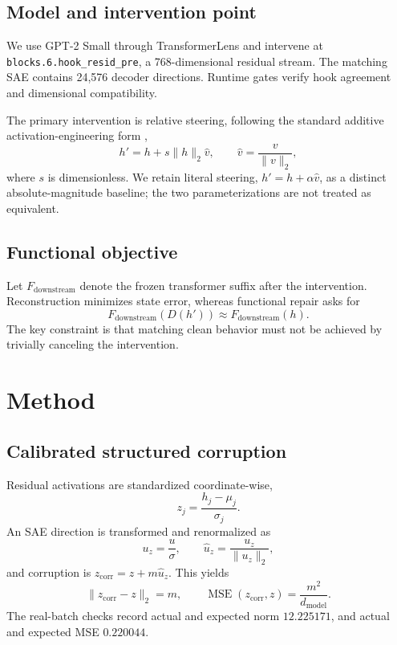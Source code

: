\documentclass[11pt,twocolumn]{article}
\begin{document}
\subsection{Model and intervention point}
We use GPT-2 Small through TransformerLens and intervene at
\texttt{blocks.6.hook\_resid\_pre}, a 768-dimensional residual stream. The matching SAE contains 24,576 decoder directions. Runtime gates verify hook agreement and dimensional compatibility.

The primary intervention is relative steering, following the standard additive activation-engineering form \citep{turner2023activation,rimsky2024caa},
\begin{equation}
  h' = h + s\lVert h\rVert_2 \hat v,
  \qquad \hat v=\frac{v}{\lVert v\rVert_2},
\end{equation}
where $s$ is dimensionless. We retain literal steering, $h'=h+\alpha\hat v$, as a distinct absolute-magnitude baseline; the two parameterizations are not treated as equivalent.

\subsection{Functional objective}
Let $F_{\mathrm{downstream}}$ denote the frozen transformer suffix after the intervention. Reconstruction minimizes state error, whereas functional repair asks for
\begin{equation}
  F_{\mathrm{downstream}}(D(h'))
  \approx F_{\mathrm{downstream}}(h).
\end{equation}
The key constraint is that matching clean behavior must not be achieved by trivially canceling the intervention.

\section{Method}
\subsection{Calibrated structured corruption}
Residual activations are standardized coordinate-wise,
\begin{equation}
  z_j = \frac{h_j-\mu_j}{\sigma_j}.
\end{equation}
An SAE direction is transformed and renormalized as
\begin{equation}
  u_z=\frac{u}{\sigma},\qquad
  \hat u_z=\frac{u_z}{\lVert u_z\rVert_2},
\end{equation}
and corruption is $z_{\mathrm{corr}}=z+m\hat u_z$. This yields
\begin{equation}
\lVert z_{\mathrm{corr}}-z\rVert_2=m,
\qquad
\operatorname{MSE}(z_{\mathrm{corr}},z)=\frac{m^2}{d_{\mathrm{model}}}.
\end{equation}
The real-batch checks record actual and expected norm $12.225171$, and actual and expected MSE $0.220044$.
\end{document}
